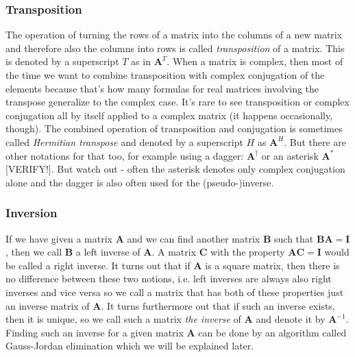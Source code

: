 \subsubsection{Transposition}
The operation of turning the rows of a matrix into the columns of a new matrix and therefore also the columns into rows is called \emph{transposition} of a matrix. This is denoted by a superscript $T$ as in $\mathbf{A}^T$. When a matrix is complex, then most of the time we want to combine transposition with complex conjugation of the elements because that's how many formulas for real matrices involving the transpose generalize to the complex case. It's rare to see transposition or complex conjugation all by itself applied to a complex matrix (it happens occasionally, though). The combined operation of transposition and conjugation is sometimes called \emph{Hermitian transpose} and denoted by a superscript $H$ as $\mathbf{A}^H$. But there are other notations for that too, for example using a dagger: $\mathbf{A}^\dagger$ or an asterisk $\mathbf{A}^*$ [VERIFY!]. But watch out - often the asterisk denotes only complex conjugation alone and the dagger is also often used for the (pseudo-)inverse.





\subsubsection{Inversion}
If we have given a matrix $\mathbf{A}$ and we can find another matrix $\mathbf{B}$ such that  $\mathbf{B} \mathbf{A} = \mathbf{I}$, then we call $\mathbf{B}$ a left inverse of $\mathbf{A}$. A matrix $\mathbf{C}$ with the property $\mathbf{A} \mathbf{C} = \mathbf{I}$ would be called a right inverse. It turns out that if $\mathbf{A}$ is a square matrix, then there is no difference between these two notions, i.e. left inverses are always also right inverses and vice versa so we call a matrix that has both of these properties just an inverse matrix of $\mathbf{A}$. It turns furthermore out that if such an inverse exists, then it is unique, so we call such a matrix \emph{the inverse} of $\mathbf{A}$ and denote it by $\mathbf{A}^{-1}$. Finding such an inverse for a given matrix $\mathbf{A}$ can be done by an algorithm called Gauss-Jordan elimination which we will be explained later.

